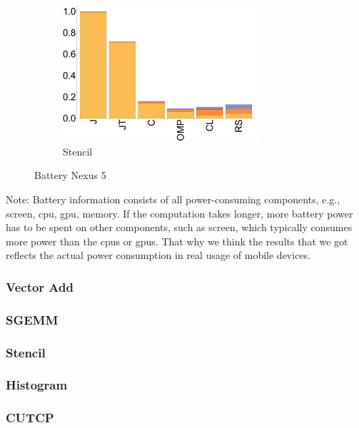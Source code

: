 \begin{figure}[ht]
  \begin{subfigure}[b]{0.3\textwidth}
      \includegraphics[width=0.8\textwidth]{data/bbattery_stencil_nexus7.pdf}
      \caption{Stencil}
  \end{subfigure}

  \caption{Battery Nexus 5}
\end{figure}
Note: Battery information consists of all power-consuming components, e.g., screen,
cpu, gpu, memory. If the computation takes longer, more battery power has to
be spent on other components, such as screen, which typically consumes more
power than the cpus or gpus. That why we think the results that we got
reflects the actual power consumption in real usage of mobile devices.

\subsubsection{Vector Add}

\subsubsection{SGEMM}

\subsubsection{Stencil}

\subsubsection{Histogram}

\subsubsection{CUTCP}
